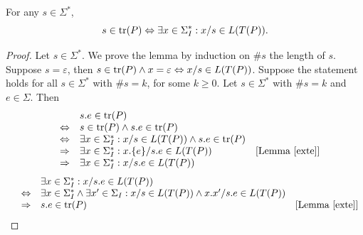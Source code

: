 \begin{lemma}\label{cont}
For any $s\in \Sigma^*$, 
$$s\in \text{tr}(P) \Leftrightarrow \exists x\in \Sigma_I^*: x/s \in L(T(P)).$$
\end{lemma}
%
\begin{proof}
Let $s\in \Sigma^*$. We prove the lemma by induction on $\#s$ the length of $s$. Suppose $s=\varepsilon $, then $s\in \text{tr}(P)\wedge x=\varepsilon \Leftrightarrow x/s\in L(T(P))$. Suppose the statement holds for all $s\in \Sigma^*$ with $\#s=k$, for some $k\ge 0$. Let $s\in \Sigma^*$ with $\#s=k$ and $e\in\Sigma$. 
Then \[\begin{array}{llll}
&& s.e\in \text{tr}(P)\\ 
&\Leftrightarrow & s\in \text{tr}(P)\wedge s.e\in \text{tr}(P)\\
&\Leftrightarrow &  \exists x\in \Sigma_I^*: x/s\in L(T(P))\wedge s.e\in \text{tr}(P)\\
&\Rightarrow & \exists x\in \Sigma_I^*: x.\{e\}/s.e\in L(T(P))&[{\text{Lemma~\ref{exte}}}]\\
&\Rightarrow & \exists x\in \Sigma_I^*: x/s.e\in L(T(P))
\end{array}
\]
 \[\begin{array}{llll}
&& \exists x\in \Sigma_I^*: x/s.e\in L(T(P))\\ 
&\Leftrightarrow & \exists x\in \Sigma_I^*\wedge \exists x'\in \Sigma_I: x/s\in L(T(P))\wedge x.x'/s.e\in L(T(P))\\
&\Rightarrow & s.e\in \text{tr}(P)&[{\text{Lemma~\ref{exte}}}]\\
\end{array}
\]
\xbox
\end{proof}

